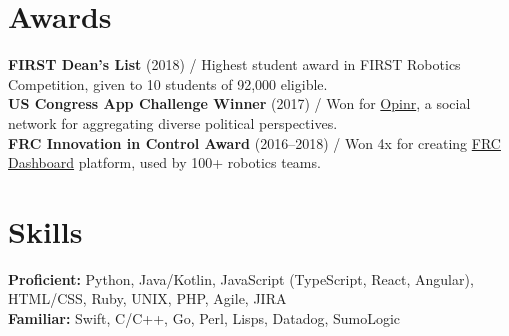 \documentclass[10pt, a4paper]{article}
\newcommand{\years}[1]{\marginnote{\scriptsize #1}}
\begin{document}
\vspace{-7mm}
\section*{Awards}
\textbf{FIRST Dean's List} (2018) / Highest student award in FIRST Robotics Competition, given to 10 students of 92,000 eligible.\\
\textbf{US Congress App Challenge Winner} (2017) / Won for \href{http://opinr.me}{Opinr}, a social network for aggregating diverse political perspectives.\\
\textbf{FRC Innovation in Control Award} (2016--2018) / Won 4x for creating \href{https://frcdashboard.github.io}{FRC Dashboard} platform, used by 100+ robotics teams.\\

\vspace{-7mm}
\section*{Skills}
\textbf{Proficient:} Python, Java/Kotlin, JavaScript (TypeScript, React, Angular), HTML/CSS, Ruby, UNIX, PHP, Agile, JIRA\\
\textbf{Familiar:} Swift, C/C++, Go, Perl, Lisps, Datadog, SumoLogic\\

\end{document}
